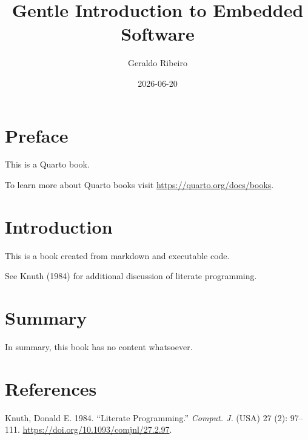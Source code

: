 \documentclass[
  letterpaper,
  DIV=11,
  numbers=noendperiod]{scrreprt}
\title{Gentle Introduction to Embedded Software}
\author{Geraldo Ribeiro}
\date{2026-06-20}
\newlength{\cslhangindent}
\newenvironment{CSLReferences}[2] %
 {\begin{list}{}{%
  \setlength{\itemindent}{0pt}
  \setlength{\leftmargin}{0pt}
  \setlength{\parsep}{0pt}
  \ifodd #1
   \setlength{\leftmargin}{\cslhangindent}
   \setlength{\itemindent}{-1\cslhangindent}
  \fi
  \setlength{\itemsep}{#2\baselineskip}}}
 {\end{list}}
\renewcommand*\contentsname{Table of contents}
\newcommand\contentsname{Table of contents}
\begin{document}
\maketitle

\renewcommand*\contentsname{Table of contents}
{
\setcounter{tocdepth}{2}
\tableofcontents
}


\chapter*{Preface}\label{preface}


This is a Quarto book.

To learn more about Quarto books visit
\url{https://quarto.org/docs/books}.


\chapter{Introduction}\label{introduction}

This is a book created from markdown and executable code.

See Knuth (1984) for additional discussion of literate programming.


\chapter{Summary}\label{summary}

In summary, this book has no content whatsoever.


\chapter*{References}\label{references}


\protect{}\label{refs}
\begin{CSLReferences}{1}{1}
Knuth, Donald E. 1984. {``Literate Programming.''} \emph{Comput. J.}
(USA) 27 (2): 97--111. \url{https://doi.org/10.1093/comjnl/27.2.97}.

\end{CSLReferences}
\end{document}
